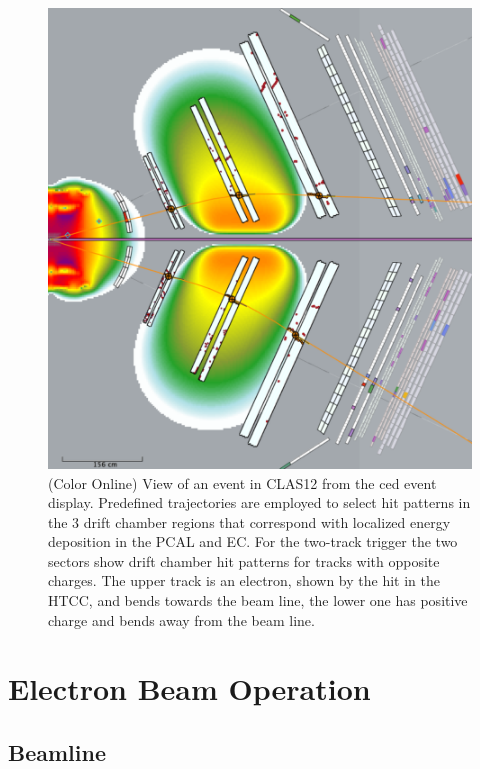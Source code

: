 \documentclass[final,3p,twocolumn]{elsarticle}
\begin{document}
\begin{figure}[htbp!]
\centerline{\includegraphics[width=0.95\columnwidth]{trigger.png}}
\caption{(Color Online) View of an event in CLAS12 from the ced event display. Predefined trajectories 
are employed to select hit
patterns in the 3 drift chamber regions that correspond with localized energy deposition
in the PCAL and EC. For the two-track trigger the two sectors show drift chamber hit patterns for tracks with
opposite charges. The upper track is an electron, shown by the hit in the HTCC, and bends towards the beam line, 
the lower one has positive charge and bends away from the beam line.}
\label{trigger}
\end{figure} 



\section{Electron Beam Operation} 

\subsection{Beamline}
\end{document}
